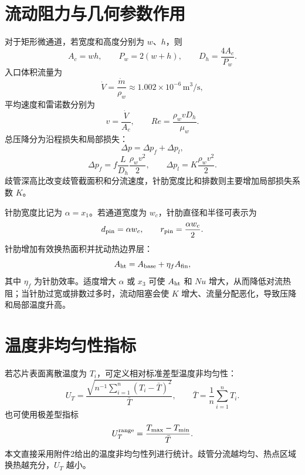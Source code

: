 \documentclass[UTF8,a4paper,12pt]{ctexart}
\begin{document}
\section{流动阻力与几何参数作用}

对于矩形微通道，若宽度和高度分别为 $w$、$h$，则
\begin{equation}
A_c=wh,\qquad P_w=2(w+h),\qquad D_h=\frac{4A_c}{P_w}.
\end{equation}
入口体积流量为
\begin{equation}
\dot V=\frac{\dot m}{\rho_w}\approx1.002\times10^{-6}\,\mathrm{m^3/s},
\end{equation}
平均速度和雷诺数分别为
\begin{equation}
v=\frac{\dot V}{A_c},\qquad Re=\frac{\rho_wvD_h}{\mu_w}.
\end{equation}
总压降分为沿程损失和局部损失：
\begin{equation}
\Delta p=\Delta p_f+\Delta p_l,
\end{equation}
\begin{equation}
\Delta p_f=f\frac{L}{D_h}\frac{\rho_wv^2}{2},
\qquad
\Delta p_l=K\frac{\rho_wv^2}{2}.
\end{equation}
歧管深高比改变歧管截面积和分流速度，针肋宽度比和排数则主要增加局部损失系数 $K$。

针肋宽度比记为 $\alpha=x_1$。若通道宽度为 $w_c$，针肋直径和半径可表示为
\begin{equation}
d_{\rm pin}=\alpha w_c,\qquad r_{\rm pin}=\frac{\alpha w_c}{2}.
\end{equation}
针肋增加有效换热面积并扰动热边界层：
\begin{equation}
A_{\rm ht}=A_{\rm base}+\eta_fA_{\rm fin},
\end{equation}
其中 $\eta_f$ 为针肋效率。适度增大 $\alpha$ 或 $x_3$ 可使 $A_{\rm ht}$ 和 $Nu$ 增大，从而降低对流热阻；当针肋过宽或排数过多时，流动阻塞会使 $K$ 增大、流量分配恶化，导致压降和局部温度升高。

\section{温度非均匀性指标}

若芯片表面离散温度为 $T_i$，可定义相对标准差型温度非均匀性：
\begin{equation}
U_T=\frac{\sqrt{n^{-1}\sum_{i=1}^n(T_i-\bar T)^2}}{\bar T},
\qquad \bar T=\frac1n\sum_{i=1}^nT_i.
\end{equation}
也可使用极差型指标
\begin{equation}
U_T^{\rm range}=\frac{T_{\max}-T_{\min}}{\bar T}.
\end{equation}
本文直接采用附件2给出的温度非均匀性列进行统计。歧管分流越均匀、热点区域换热越充分，$U_T$ 越小。
\end{document}
